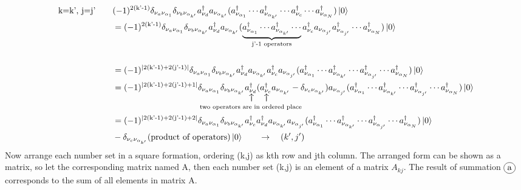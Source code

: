 \documentclass{article}
\makeatletter
\newcommand\vertarrowbox[2]{%
    \begin{array}[t]{@{}c@{}} #1 \\
    \rotatebox{90}{$\xrightarrow{\hphantom{a}}$} \\[-1ex]
    \mathclap{\scriptstyle\text{#2}}%
    \end{array}}
\newcommand\encircle[1]{%
    \tikz[baseline=(X.base)] 
      \node (X) [draw, shape=circle, inner sep=0] {\strut #1};}
\makeatother
\begin{document}
\begin{align*}
    \text{k=k', j=j'} \qquad &(-1)^{2(\text{k'-1})}\delta_{\nu_a \nu_{\alpha_1}}\delta_{\nu_b \nu_{\alpha_{k'}}} a^{\dagger}_{\nu_d} a_{\nu_{\alpha_{k'}}} (a^{\dagger}_{\nu_{\alpha_1}} \cdots a^{\dagger}_{\nu_{\alpha_{k'}}} \cdots a^{\dagger}_{\nu_c}  \cdots a^{\dagger}_{\nu_{\alpha_N}})\ket{0}\\
    &= (-1)^{2(\text{k'-1})}\delta_{\nu_a \nu_{\alpha_1}}\delta_{\nu_b \nu_{\alpha_{k'}}} a^{\dagger}_{\nu_d} a_{\nu_{\alpha_{k'}}} (\underbrace{a^{\dagger}_{\nu_{\alpha_1}} \cdots a^{\dagger}_{\nu_{\alpha_{k'}}}  \cdots }_{\text{j'-1 operators}}a^{\dagger}_{\nu_c} a_{\nu_{\alpha_{j'}}} a^{\dagger}_{\nu_{\alpha_{j'}}} \cdots a^{\dagger}_{\nu_{\alpha_N}})\ket{0}\\
    &\\
    &= (-1)^{|2(\text{k'-1})+2(\text{j'-1})|}\delta_{\nu_a \nu_{\alpha_1}}\delta_{\nu_b \nu_{\alpha_{k'}}} a^{\dagger}_{\nu_d} a_{\nu_{\alpha_{k'}}} a^{\dagger}_{\nu_c} a_{\nu_{\alpha_{j'}}} (a^{\dagger}_{\nu_{\alpha_1}} \cdots a^{\dagger}_{\nu_{\alpha_{k'}}}  \cdots a^{\dagger}_{\nu_{\alpha_{j'}}} \cdots a^{\dagger}_{\nu_{\alpha_N}})\ket{0}\\ 
    &= (-1)^{|2(\text{k'-1})+2(\text{j'-1})+1|}\delta_{\nu_a \nu_{\alpha_1}}\delta_{\nu_b \nu_{\alpha_{k'}}} \vertarrowbox{a^{\dagger}_{\nu_d}}{two operators are in ordered place} (\vertarrowbox{a^{\dagger}_{\nu_c}}{} a_{\nu_{\alpha_{k'}}}-\delta_{\nu_c \nu_{\alpha_{k'}}}) a_{\nu_{\alpha_{j'}}} (a^{\dagger}_{\nu_{\alpha_1}} \cdots a^{\dagger}_{\nu_{\alpha_{k'}}}  \cdots a^{\dagger}_{\nu_{\alpha_{j'}}} \cdots a^{\dagger}_{\nu_{\alpha_N}})\ket{0}\\ 
    &= (-1)^{|2(\text{k'-1})+2(\text{j'-1})+2|}\delta_{\nu_a \nu_{\alpha_1}}\delta_{\nu_b \nu_{\alpha_{k'}}} a^{\dagger}_{\nu_c} a^{\dagger}_{\nu_d} a_{\nu_{\alpha_{k'}}} a_{\nu_{\alpha_{j'}}} (a^{\dagger}_{\nu_{\alpha_1}} \cdots a^{\dagger}_{\nu_{\alpha_{k'}}}  \cdots a^{\dagger}_{\nu_{\alpha_{j'}}} \cdots a^{\dagger}_{\nu_{\alpha_N}})\ket{0}\\ 
    &-\delta_{\nu_c \nu_{\alpha_{k'}}}(\text{product of operators})\ket{0} \qquad \rightarrow \quad (k', j')
\end{align*}
Now arrange each number set in a square formation, ordering (k,j) as kth row and jth column. The arranged form can be shown as a matrix,
so let the corresponding matrix named A, then each number set (k,j) is an element of a matrix $A_{kj}$. The result of summation $\encircle{a}$ corresponds to the sum of all elements in matrix A. 
\end{document}
